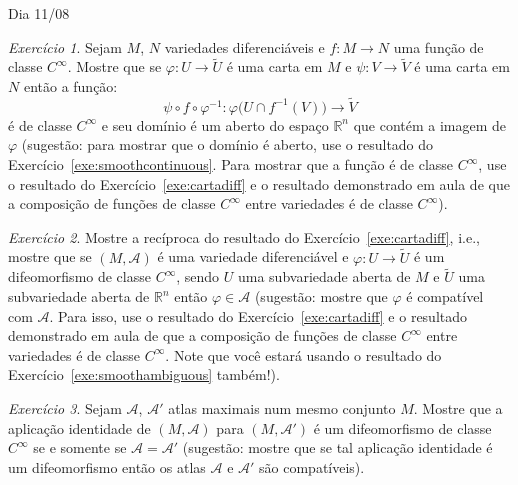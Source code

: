 \documentclass[oneside,11pt]{amsart}
\newcommand{\R}{\mathds R}
\theoremstyle{remark}\newtheorem{exercise}{Exercício}[section]
\theoremstyle{plain}\newtheorem{teo}{Teorema}[section]
\theoremstyle{plain}\newtheorem{lem}[teo]{Lema}
\theoremstyle{plain}\newtheorem{prop}[teo]{Proposição}
\theoremstyle{definition}\newtheorem{defin}[teo]{Definição}
\theoremstyle{remark}\newtheorem{rem}[teo]{Observação}
\theoremstyle{definition}\newtheorem{example}[teo]{Exemplo}
\numberwithin{equation}{section}
\begin{document}
\begin{section}{Dia 11/08}
\begin{exercise}
Sejam $M$, $N$ variedades diferenciáveis e $f:M\to N$ uma função de classe $C^\infty$. Mostre que se $\varphi:U\to\widetilde U$
é uma carta em $M$ e $\psi:V\to\widetilde V$ é uma carta em $N$ então a função:
\[\psi\circ f\circ\varphi^{-1}:\varphi\big(U\cap f^{-1}(V)\big)\longrightarrow\widetilde V\]
é de classe $C^\infty$ e seu domínio é um aberto do espaço $\R^n$ que contém a imagem de $\varphi$ (sugestão: para mostrar que o domínio é aberto,
use o resultado do Exercício~\ref{exe:smoothcontinuous}. Para mostrar que a função é de classe $C^\infty$, use o resultado do Exercício~\ref{exe:cartadiff}
e o resultado demonstrado em aula de que a composição de funções de classe $C^\infty$ entre variedades é de classe $C^\infty$).
\end{exercise}

\begin{exercise}\label{exe:difeocarta}
Mostre a recíproca do resultado do Exercício~\ref{exe:cartadiff}, i.e., mostre que se $(M,\mathcal A)$ é uma variedade diferenciável
e $\varphi:U\to\widetilde U$ é um difeomorfismo de classe $C^\infty$, sendo $U$ uma subvariedade aberta de $M$ e $\widetilde U$ uma subvariedade aberta
de $\R^n$ então $\varphi\in\mathcal A$ (sugestão: mostre que $\varphi$ é compatível com $\mathcal A$. Para isso, use o resultado do Exercício~\ref{exe:cartadiff}
e o resultado demonstrado em aula de que a composição de funções de classe $C^\infty$ entre variedades é de classe $C^\infty$. Note que você estará
usando o resultado do Exercício~\ref{exe:smoothambiguous} também!).
\end{exercise}

\begin{exercise}\label{exe:Iddifeo}
Sejam $\mathcal A$, $\mathcal A'$ atlas maximais num mesmo conjunto $M$. Mostre que a aplicação identidade de $(M,\mathcal A)$ para $(M,\mathcal A')$ é um difeomorfismo
de classe $C^\infty$ se e somente se $\mathcal A=\mathcal A'$ (sugestão: mostre que se tal aplicação identidade é um difeomorfismo então os atlas $\mathcal A$
e $\mathcal A'$ são compatíveis).
\end{exercise}


\end{section}
\end{document}
